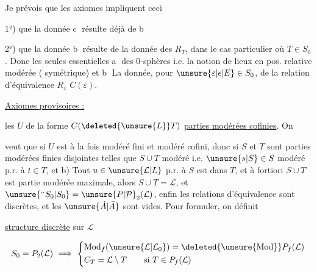 Je prévois que les axiomes impliquent
ceci

1°) que la donnée \textcircled{\scriptsize c} résulte déjà de \textcircled{\scriptsize b}

2°) que la donnée \textcircled{\scriptsize b} résulte de
la donnée des $R_T$,  dans le cas
particulier où $T\in S_0$. Donc
les seules  essentielles 
\textcircled{\scriptsize a}  des 0-sphères i.e. la notion
de  lieux en pos. relative modérée
(  symétrique) et \textcircled{\scriptsize b} La donnée,
pour  $\unsure{\varepsilon|\epsilon|E}\in S_0$, de la relation
d'équivalence $R_{\varepsilon}$  $C(\varepsilon)$.

 \uline{Axiomes provisoires :}

  les $U$ de la forme
$C(\deleted{\unsure{L}}T)$ \uline{parties modérées cofinies}. On


veut que si $U$  est à la fois modéré fini
et modéré cofini, donc si $S$ et $T$
sont  parties modérées finies
 disjointes telles que   $S\cup T$
modéré i.e.  $\unsure{s|S}\in S$ modéré p.r. à 
$t\in T$, et b) Tout $u\in\unsure{\mathcal L|L}$  p.r. à
$S$ est dans $T$\unsure{;|,},  et
à fortiori $S\cup T$ est partie  modérée
maximale, alors $S\cup T=\mathcal L$, et
$\unsure{{}^{\cdot\cdot}S_0|S_0}=\unsure{P|\mathcal P}_2(\mathcal L)$, enfin les relations
d'équivalence sont discrètes, et les
$\unsure{\dot A|\bar A}$ sont vides. Pour  formuler,
on définit 

  \uline{structure  discrète} sur $\mathcal L$

\[
 S_0=P_2(\mathcal L)\ \Longrightarrow\
 \left\{\begin{aligned}
 &\mathrm{Mod}_f(\unsure{\mathcal L|\mathcal L_0})=\deleted{\unsure{\mathrm{Mod}}}P_f(\mathcal L)\\
 &C_T=\mathcal L\setminus T\qquad\text{si }T\in P_f(\mathcal L)
 \end{aligned}\right.
\]

